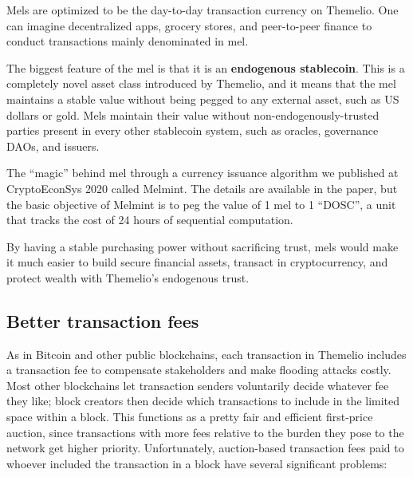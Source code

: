 \documentclass[headinclude,12pt]{scrbook}
\begin{document}
Mels are optimized to be the day-to-day transaction currency on
Themelio. One can imagine decentralized apps, grocery stores, and
peer-to-peer finance to conduct transactions mainly denominated in mel.

The biggest feature of the mel is that it is an \textbf{endogenous
    stablecoin}. This is a completely novel asset class introduced by
Themelio, and it means that the mel maintains a stable value without
being pegged to any external asset, such as US dollars or gold. Mels
maintain their value without non-endogenously-trusted parties present in
every other stablecoin system, such as oracles, governance DAOs, and
issuers.

The ``magic'' behind mel through a currency issuance algorithm we
published at
CryptoEconSys 2020 \cite{dong2020melmint} called Melmint. The details are available in the paper, but the
basic objective of Melmint is to peg the value of 1 mel to 1 ``DOSC'', a
unit that tracks the cost of 24 hours of sequential computation.


By having a stable purchasing power without sacrificing trust, mels
would make it much easier to build secure financial assets, transact in
cryptocurrency, and protect wealth with Themelio's endogenous trust.


\subsection{Better transaction fees}

As in Bitcoin and other public blockchains, each transaction in Themelio includes a transaction fee to compensate stakeholders and make flooding attacks costly. Most other blockchains let transaction senders voluntarily decide whatever fee they like; block creators then decide which transactions to include in the limited space within a block. This functions as a pretty fair and efficient first-price auction, since transactions with more fees relative to the burden they pose to the network get higher priority. Unfortunately, auction-based transaction fees paid to whoever included the transaction in a block have several significant problems:
\end{document}
